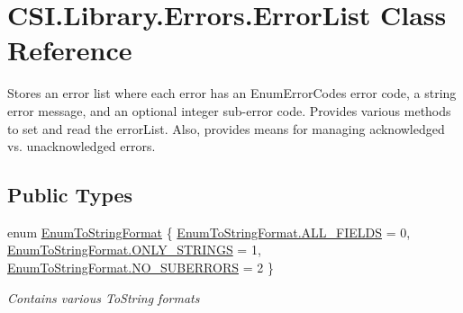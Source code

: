 \hypertarget{class_c_s_i_1_1_library_1_1_errors_1_1_error_list}{}\section{C\+S\+I.\+Library.\+Errors.\+Error\+List Class Reference}
\label{class_c_s_i_1_1_library_1_1_errors_1_1_error_list}


Stores an error list where each error has an Enum\+Error\+Codes error code, a string error message, and an optional integer sub-\/error code. Provides various methods to set and read the error\+List. Also, provides means for managing acknowledged vs. unacknowledged errors.  


\subsection*{Public Types}
\begin{DoxyCompactItemize}
\item 
enum \mbox{\hyperlink{class_c_s_i_1_1_library_1_1_errors_1_1_error_list_aa208d07fb97d8c5eaa0910fde0c7921e}{Enum\+To\+String\+Format}} \{ \mbox{\hyperlink{class_c_s_i_1_1_library_1_1_errors_1_1_error_list_aa208d07fb97d8c5eaa0910fde0c7921eae54c68397ff7318db2b70dde7ee6ed05}{Enum\+To\+String\+Format.\+A\+L\+L\+\_\+\+F\+I\+E\+L\+DS}} = 0, 
\mbox{\hyperlink{class_c_s_i_1_1_library_1_1_errors_1_1_error_list_aa208d07fb97d8c5eaa0910fde0c7921ead28d2b7c61d16fdb9ede7dc09e9cf481}{Enum\+To\+String\+Format.\+O\+N\+L\+Y\+\_\+\+S\+T\+R\+I\+N\+GS}} = 1, 
\mbox{\hyperlink{class_c_s_i_1_1_library_1_1_errors_1_1_error_list_aa208d07fb97d8c5eaa0910fde0c7921ea82bb5e4d90fa668321242380aca7e9be}{Enum\+To\+String\+Format.\+N\+O\+\_\+\+S\+U\+B\+E\+R\+R\+O\+RS}} = 2
 \}
\begin{DoxyCompactList}\small\item\em Contains various To\+String formats \end{DoxyCompactList}\end{DoxyCompactItemize}
